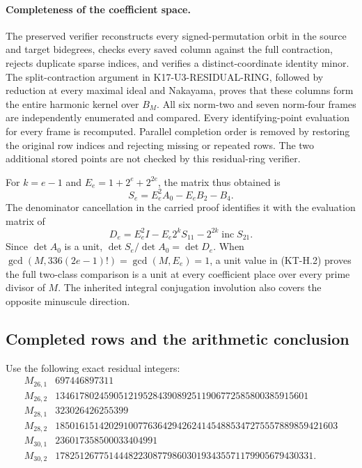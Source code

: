 \paragraph{Completeness of the coefficient space.}
The preserved verifier reconstructs every signed-permutation
orbit in the source and target bidegrees, checks every saved
column against the full contraction, rejects duplicate sparse
indices, and verifies a distinct-coordinate identity minor.
The split-contraction argument in K17-U3-RESIDUAL-RING, followed
by reduction at every maximal ideal and Nakayama, proves that
these columns form the entire harmonic kernel over $B_M$.
All six norm-two and seven norm-four frames are independently
enumerated and compared.  Every identifying-point evaluation
for every frame is recomputed.  Parallel completion order is
removed by restoring the original row indices and rejecting
missing or repeated rows.  The two additional stored points are
not checked by this residual-ring verifier.

For $k=e-1$ and $E_e=1+2^e+2^{2e}$, the matrix thus obtained is
\[
 S_e=E_e^2A_0-E_eB_2-B_4.
\]
The denominator cancellation in the carried proof identifies it
with the evaluation matrix of
\[
 D_e=E_e^2I-E_e2^kS_{11}-2^{2k}\operatorname{inc}S_{21}.
                                                        \tag{KT-H.2}
\]
Since $\det A_0$ is a unit, $\det S_e/\det A_0=\det D_e$.
When $\gcd(M,336(2e-1)!)=\gcd(M,E_e)=1$, a unit value in
(KT-H.2) proves the full two-class comparison is a unit at every
coefficient place over every prime divisor of $M$.  The inherited
integral conjugation involution also covers the opposite
minuscule direction.

\subsection{Completed rows and the arithmetic conclusion}

Use the following exact residual integers:
\[
\begin{array}{c|r}
 M_{26,1}&697446897311\\
 M_{26,2}&1346178024590512195284390892511906772585800385915601\\
 M_{28,1}&323026426255399\\
 M_{28,2}&1850161514202910077636429426241454885347275557889859421603\\
 M_{30,1}&236017358500033404991\\
 M_{30,2}&17825126775144482230877986030193435571179905679430331.
\end{array}                                             \tag{KT-H.3}
\]

